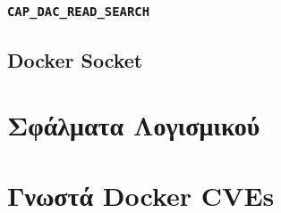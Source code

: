 \subsubsection{\texttt{\textlatin{CAP\_DAC\_READ\_SEARCH}}}

\subsection{\textlatin{Docker Socket}}



\section{Σφάλματα Λογισμικού}
\section{Γνωστά \textlatin{Docker CVEs}}


